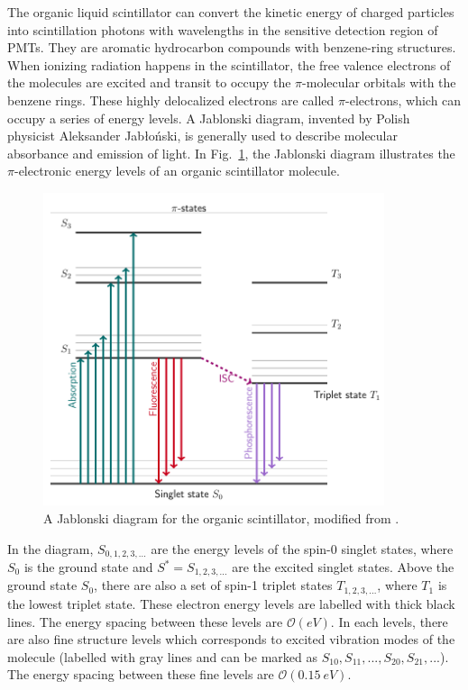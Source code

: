 The organic liquid scintillator can convert the kinetic energy of charged particles into scintillation photons with wavelengths in the sensitive detection region of PMTs. They are aromatic hydrocarbon compounds with benzene-ring structures. When ionizing radiation happens in the scintillator, the free valence electrons of the molecules are excited and transit to occupy the $\pi$-molecular orbitals with the benzene rings. These highly delocalized electrons are called $\pi$-electrons, which can occupy a series of energy levels. A Jablonski diagram, invented by Polish physicist Aleksander Jab\l o\'{n}ski, is generally used to describe molecular absorbance and emission of light. In Fig.~\ref{jablonski}, the Jablonski diagram illustrates the $\pi$-electronic energy levels of an organic scintillator molecule\cite{knoll2010radiation,leo2012techniques}. 
\begin{figure}[!htb]
	\centering
	\includegraphics[width=10cm]{jablonski.png}
	\caption{A Jablonski diagram for the organic scintillator, modified from \cite{birks1965theory, knoll2010radiation}.}
	\label{jablonski}
\end{figure}

In the diagram, $S_{0,1,2,3,...}$ are the energy levels of the spin-0 singlet states, where $S_0$ is the ground state and $S^*=S_{1,2,3,...}$ are the excited singlet states. Above the ground state $S_0$, there are also a set of spin-1 triplet states $T_{1,2,3,...}$, where $T_1$ is the lowest triplet state. These electron energy levels are labelled with thick black lines. The energy spacing between these levels are $\mathcal{O}(eV)$. In each levels, there are also fine structure levels which corresponds to excited vibration modes of the molecule (labelled with gray lines and can be marked as $S_{10}, S_{11}, ..., S_{20},S_{21}, ...$). The energy spacing between these fine levels are $\mathcal{O}(0.15~eV)$\cite{leo2012techniques, knoll2010radiation}.

